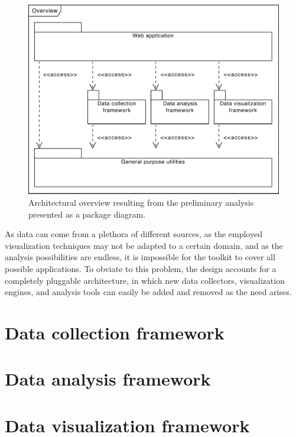 \begin{figure}
    \centering
	\includegraphics[width=.7\linewidth]{images/simple-overview}
	\caption[Architectural overview of the CSAT software suite.]{Architectural overview resulting from the preliminary analysis presented as a package diagram.}
	\label{fig:simple-overview}
\end{figure}

As data can come from a plethora of different sources, as the employed visualization techniques may not be adapted to a certain domain, and as the analysis possibilities are endless, it is impossible for the toolkit to cover all possible applications. To obviate to this problem, the design accounts for a completely pluggable architecture, in which new data collectors, visualization engines, and analysis tools can easily be added and removed as the need arises.


\section{Data collection framework}

\section{Data analysis framework}

\section{Data visualization framework}

